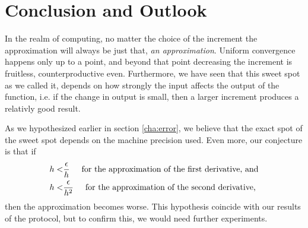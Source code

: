 \section{Conclusion and Outlook}\label{cha:conclusion}

In the realm of computing, no matter the choice of the increment the approximation will always be just that, \textit{an approximation}. Uniform convergence happens only up to a point, and beyond that point decreasing the increment is fruitless, counterproductive even. Furthermore, we have seen that this sweet spot as we called it, depends on how strongly the input affects the output of the function, i.e. if the change in output is small, then a larger increment produces a relativly good result.

As we hypothesized earlier in section \ref{cha:error}, we believe that the exact spot of the sweet spot depends on the machine precision used. Even more, our conjecture is that if
\begin{align*}
    h <& \frac{\epsilon}{h} \hspace{0.5cm} \text{for the approximation of the first derivative, and}\\
    h <& \frac{\epsilon}{h^2} \hspace{0.5cm} \text{for the approximation of the second derivative,}
\end{align*}
then the approximation becomes worse. This hypothesis coincide with our results of the protocol, but to confirm this, we would need further experiments.